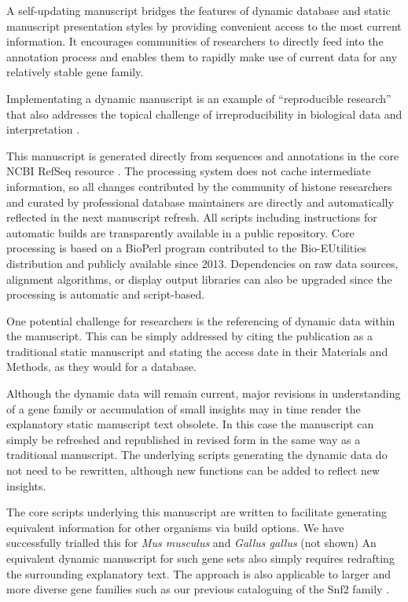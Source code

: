   A self-updating manuscript bridges the features of dynamic database and static manuscript
  presentation styles by providing convenient access to the most current information.
  It encourages communities of researchers to directly feed into the annotation process
  and enables them to rapidly make use of current data for any relatively stable gene family.

  Implementating a dynamic manuscript is an example of ``reproducible research''
  \citep{reproducible-research-bioinformatics,reproducible-research-law}
  that also addresses the topical challenge of irreproducibility in biological data
  and interpretation \citep{ErrorProne2012,OpenPrograms2012}.

  This manuscript is generated directly from sequences and annotations
  in the core NCBI RefSeq resource \citep{OLearyRefseq2016}.
  The processing system does not cache intermediate information,
  so all changes contributed by the community of histone researchers
  and curated by professional database maintainers
  are directly and automatically reflected in the next manuscript refresh.
  All scripts including instructions for automatic builds
  are transparently available in a public repository.
  Core processing is based on a BioPerl program contributed to the Bio-EUtilities distribution
  and publicly available since 2013.
  Dependencies on raw data sources, alignment algorithms, or display output libraries
  can also be upgraded since the processing is automatic and script-based.

  One potential challenge for researchers is the referencing of dynamic data within the manuscript.
  This can be simply addressed by citing the publication as a traditional static manuscript
  and stating the access date in their Materials and Methods, as they would for a database.

  Although the dynamic data will remain current,
  major revisions in understanding of a gene family or accumulation of small insights
  may in time render the explanatory static manuscript text obsolete.
  In this case the manuscript can simply be refreshed and republished in revised form
  in the same way as a traditional manuscript.
  The underlying scripts generating the dynamic data do not need to be rewritten, 
  although new functions can be added to reflect new insights.

  The core scripts underlying this manuscript are written to facilitate generating
  equivalent information for other organisms via build options.
  We have successfully trialled this for \textit{Mus musculus} and \textit{Gallus gallus} (not shown)
  An equivalent dynamic manuscript for such gene sets
  also simply requires redrafting the surrounding explanatory text.
  The approach is also applicable to larger and more diverse gene families such as
  our previous cataloguing of the Snf2 family \citep{andrew-snf2-catalogue}.
